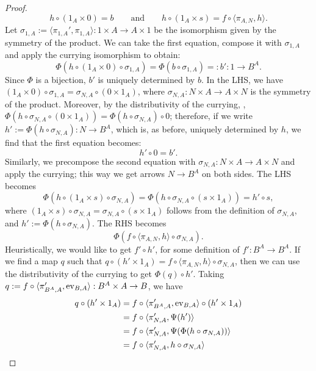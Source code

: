 \begin{proof}
    \[ h \circ (1_A \times 0) = b \qquad \text{and} \qquad h \circ (1_A \times s) = f \circ \langle \pi_{A,N}, h \rangle. \]
    Let $\sigma_{1,A} := \langle \pi_{1,A}', \pi_{1,A} \rangle : 1 \times A \to A \times 1$ be the isomorphism given by the symmetry of the product. We can take the first equation, compose it with $\sigma_{1,A}$ and apply the currying isomorphism to obtain:
    \[  \Phi(h \circ (1_A \times 0) \circ \sigma_{1,A}) = \Phi(b \circ \sigma_{1,A}) =: b' : 1 \to B^A. \]
    Since $\Phi$ is a bijection, $b'$ is uniquely determined by $b$. In the LHS, we have $(1_A \times 0) \circ \sigma_{1,A} = \sigma_{N,A} \circ (0 \times 1_A)$, where $\sigma_{N,A} : N \times A \to A \times N$ is the symmetry of the product.
    Moreover, by the distributivity of the currying, , $\Phi(h \circ \sigma_{N,A} \circ (0 \times 1_A)) = \Phi(h \circ \sigma_{N,A}) \circ 0$; therefore, if we write $h' := \Phi(h \circ \sigma_{N,A}) : N \to B^A$, which is, as before, uniquely determined by $h$, we find that the first equation becomes:
    \[ h' \circ 0 = b'. \]
    Similarly, we precompose the second equation with $\sigma_{N,A} : N \times A \to A \times N$ and apply the currying; this way we get arrows $N \to B^A$ on both sides. The LHS becomes
    \[ \Phi(h \circ (1_A \times s) \circ \sigma_{N,A}) = \Phi(h \circ \sigma_{N,A} \circ (s \times 1_A)) = h' \circ s, \]
    where $(1_A \times s) \circ \sigma_{N,A} = \sigma_{N,A} \circ (s \times 1_A)$ follows from the definition of $\sigma_{N,A}$, and $h' := \Phi(h \circ \sigma_{N,A})$. The RHS becomes
    \[ \Phi(f \circ \langle \pi_{A,N}, h \rangle \circ \sigma_{N,A}). \]
    Heuristically, we would like to get $f' \circ h'$, for some definition of $f' : B^A \to B^A$.
    If we find a map $q$ such that $q \circ (h' \times 1_A) = f \circ \langle \pi_{A,N}, h \rangle \circ \sigma_{N,A}$, then we can use the distributivity of the currying to get $\Phi(q) \circ h'$.\newline
    Taking $q := f \circ \langle \pi_{B^A,A}', \operatorname{ev}_{B,A}\rangle : B^A \times A \to B$, we have
    \begin{align*}
        q \circ (h' \times 1_A) &= f \circ \langle \pi_{B^A,A}', \ev_{B,A}\rangle \circ (h' \times 1_A) \\
                                &= f \circ \langle \pi_{N,A}',\Psi(h') \rangle \\
                                &= f \circ \langle \pi_{N,A}', \Psi(\Phi(h \circ \sigma_{N,A})) \rangle \\
                                &= f \circ \langle \pi_{N,A}', h \circ \sigma_{N,A} \rangle \\

\end{align*}
\end{proof}
